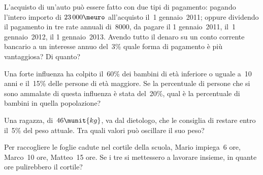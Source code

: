 \begin{htmulticols}{2}
\begin{esercizio}
\label{ese:3.212}
L'acquisto di un'auto può essere fatto con due tipi di pagamento: pagando
l'intero importo di \(23\,000\meuro\) all'acquisto il~1{\textdegree} 
gennaio~2011; oppure
dividendo il pagamento in tre rate annuali di~8000, da pagare il
1{\textdegree} gennaio~2011, il~1{\textdegree} gennaio~2012, il
1{\textdegree} gennaio~2013. Avendo tutto il denaro su un conto
corrente bancario a un interesse annuo del~3\% quale forma di pagamento
è più vantaggiosa? Di quanto? \sol{\dots}
\end{esercizio}

\begin{esercizio}
\label{ese:3.213}
Una forte influenza ha colpito il~60\% dei bambini di età
inferiore o uguale a~10 anni e il~15\% delle persone di età maggiore.
Se la percentuale di persone che si sono ammalate di questa influenza
è stata del~20\%, qual è la percentuale di bambini in quella
popolazione? 
\end{esercizio}


\begin{esercizio}
\label{ese:3.215}
 Una ragazza, di~\(46\munit{kg}\), va dal dietologo, che
le consiglia di restare entro il~5\% del peso attuale. Tra
quali valori può oscillare il suo peso? \sol{\dots}
\end{esercizio}

\begin{esercizio}
\label{ese:3.216}
Per raccogliere le foglie cadute nel cortile
della scuola, Mario impiega~6 ore, Marco~10 ore,
Matteo~15 ore. Se i tre si mettessero a lavorare
insieme, in quante ore pulirebbero il cortile? \sol{\dots}
\end{esercizio}
% 

\end{htmulticols}


